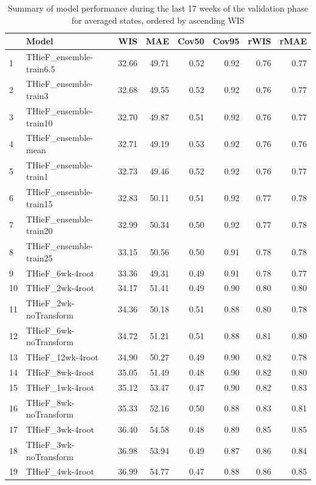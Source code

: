 \documentclass[12pt]{article}
\begin{document}
\begingroup\renewcommand{\arraystretch}{0.75}
\begin{longtable}{llrrrrrr}
\caption{Summary of model performance during the last 17 weeks of the validation phase for averaged states, ordered by ascending WIS} \\ 
  \hline
 & Model & WIS & MAE & Cov50 & Cov95 & rWIS & rMAE \\ 
  \hline
1 & THieF\_ensemble-train6.5 & 32.66 & 49.71 & 0.52 & 0.92 & 0.76 & 0.77 \\ 
  2 & THieF\_ensemble-train3 & 32.68 & 49.55 & 0.52 & 0.92 & 0.76 & 0.77 \\ 
  3 & THieF\_ensemble-train10 & 32.70 & 49.87 & 0.51 & 0.92 & 0.76 & 0.77 \\ 
  4 & THieF\_ensemble-mean & 32.71 & 49.19 & 0.53 & 0.92 & 0.76 & 0.76 \\ 
  5 & THieF\_ensemble-train1 & 32.73 & 49.46 & 0.52 & 0.92 & 0.76 & 0.77 \\ 
  6 & THieF\_ensemble-train15 & 32.83 & 50.11 & 0.51 & 0.92 & 0.77 & 0.78 \\ 
  7 & THieF\_ensemble-train20 & 32.99 & 50.34 & 0.50 & 0.92 & 0.77 & 0.78 \\ 
  8 & THieF\_ensemble-train25 & 33.15 & 50.56 & 0.50 & 0.91 & 0.78 & 0.78 \\ 
  9 & THieF\_6wk-4root & 33.36 & 49.31 & 0.49 & 0.91 & 0.78 & 0.77 \\ 
  10 & THieF\_2wk-4root & 34.17 & 51.41 & 0.49 & 0.90 & 0.80 & 0.80 \\ 
  11 & THieF\_2wk-noTransform & 34.36 & 50.18 & 0.51 & 0.88 & 0.80 & 0.78 \\ 
  12 & THieF\_6wk-noTransform & 34.72 & 51.21 & 0.51 & 0.88 & 0.81 & 0.80 \\ 
  13 & THieF\_12wk-4root & 34.90 & 50.27 & 0.49 & 0.90 & 0.82 & 0.78 \\ 
  14 & THieF\_8wk-4root & 35.05 & 51.49 & 0.48 & 0.90 & 0.82 & 0.80 \\ 
  15 & THieF\_1wk-4root & 35.12 & 53.47 & 0.47 & 0.90 & 0.82 & 0.83 \\ 
  16 & THieF\_8wk-noTransform & 35.33 & 52.16 & 0.50 & 0.88 & 0.83 & 0.81 \\ 
  17 & THieF\_3wk-4root & 36.40 & 54.58 & 0.48 & 0.89 & 0.85 & 0.85 \\ 
  18 & THieF\_3wk-noTransform & 36.98 & 53.94 & 0.49 & 0.87 & 0.86 & 0.84 \\ 
  19 & THieF\_4wk-4root & 36.99 & 54.77 & 0.47 & 0.88 & 0.86 & 0.85 \\ 

\end{longtable}
\end{document}
